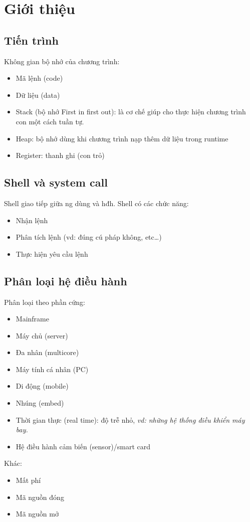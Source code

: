 \chapter{Giới thiệu}
\section{Tiến trình}
Không gian bộ nhớ của chương trình:
\begin{itemize}
\item Mã lệnh (code)
\item Dữ liệu (data)
\item Stack (bộ nhớ First in first out): là cơ chế giúp cho thực hiện chương trình con một cách tuần tự.
\item Heap: bộ nhớ dùng khi chương trình nạp thêm dữ liệu trong runtime
\item Register: thanh ghi (con trỏ)
\end{itemize}

\section{Shell và system call}
Shell giao tiếp giữa ng dùng và hđh. Shell có các chức năng:
\begin{itemize}
\item Nhận lệnh
\item Phân tích lệnh (vd: đúng cú pháp không, etc\ldots)
\item Thực hiện yêu cầu lệnh
\end{itemize}

\section{Phân loại hệ điều hành}
Phân loại theo phần cứng:
\begin{itemize}
\item Mainframe
\item Máy chủ (server)
\item Đa nhân (multicore)
\item Máy tính cá nhân (PC)
\item Di động (mobile)
\item Nhúng (embed)
\item Thời gian thực (real time): độ trễ nhỏ, \textit{vd: những hệ thống điều khiển máy bay.}
\item Hệ điều hành cảm biến (sensor)/smart card
\end{itemize}
Khác:
\begin{itemize}
\item Mất phí
\item Mã nguồn đóng
\item Mã nguồn mở
\end{itemize}
